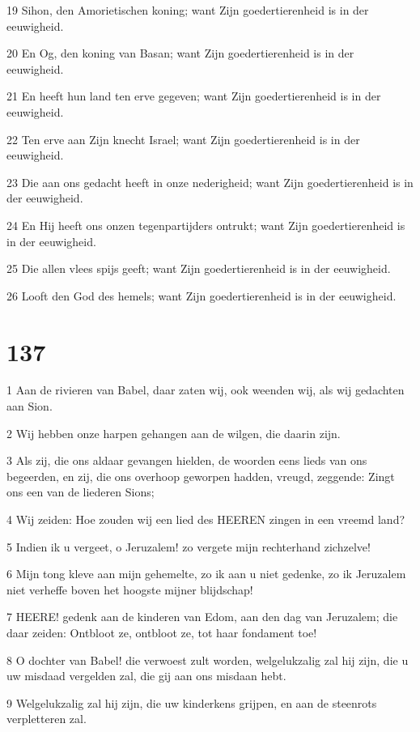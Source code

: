 \par 19 Sihon, den Amorietischen koning; want Zijn goedertierenheid is in der eeuwigheid.
\par 20 En Og, den koning van Basan; want Zijn goedertierenheid is in der eeuwigheid.
\par 21 En heeft hun land ten erve gegeven; want Zijn goedertierenheid is in der eeuwigheid.
\par 22 Ten erve aan Zijn knecht Israel; want Zijn goedertierenheid is in der eeuwigheid.
\par 23 Die aan ons gedacht heeft in onze nederigheid; want Zijn goedertierenheid is in der eeuwigheid.
\par 24 En Hij heeft ons onzen tegenpartijders ontrukt; want Zijn goedertierenheid is in der eeuwigheid.
\par 25 Die allen vlees spijs geeft; want Zijn goedertierenheid is in der eeuwigheid.
\par 26 Looft den God des hemels; want Zijn goedertierenheid is in der eeuwigheid.

\chapter{137}

\par 1 Aan de rivieren van Babel, daar zaten wij, ook weenden wij, als wij gedachten aan Sion.
\par 2 Wij hebben onze harpen gehangen aan de wilgen, die daarin zijn.
\par 3 Als zij, die ons aldaar gevangen hielden, de woorden eens lieds van ons begeerden, en zij, die ons overhoop geworpen hadden, vreugd, zeggende: Zingt ons een van de liederen Sions;
\par 4 Wij zeiden: Hoe zouden wij een lied des HEEREN zingen in een vreemd land?
\par 5 Indien ik u vergeet, o Jeruzalem! zo vergete mijn rechterhand zichzelve!
\par 6 Mijn tong kleve aan mijn gehemelte, zo ik aan u niet gedenke, zo ik Jeruzalem niet verheffe boven het hoogste mijner blijdschap!
\par 7 HEERE! gedenk aan de kinderen van Edom, aan den dag van Jeruzalem; die daar zeiden: Ontbloot ze, ontbloot ze, tot haar fondament toe!
\par 8 O dochter van Babel! die verwoest zult worden, welgelukzalig zal hij zijn, die u uw misdaad vergelden zal, die gij aan ons misdaan hebt.
\par 9 Welgelukzalig zal hij zijn, die uw kinderkens grijpen, en aan de steenrots verpletteren zal.

